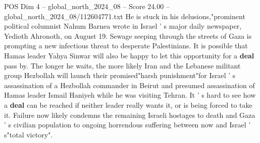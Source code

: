 \begin{textsample}{POS Dim 4 – global\_north\_2024\_08 – Score 24.00 – global\_north\_2024\_08/112604771.txt}
He is stuck in his delusions,"prominent political columnist Nahum Barnea wrote in Israel ' s major daily newspaper, Yedioth Ahronoth, on August 19.
Sewage seeping through the streets of Gaza is prompting a new infectious threat to desperate Palestinians.
It is possible that Hamas leader Yahya Sinwar will also be happy to let this opportunity for a \textbf{deal} pass by.
The longer he waits, the more likely Iran and the Lebanese militant group Hezbollah will launch their promised"harsh punishment"for Israel ' s assassination of a Hezbollah commander in Beirut and presumed assassination of Hamas leader Ismail Haniyeh while he was visiting Tehran.
It ' s hard to see how a \textbf{deal} can be reached if neither leader really wants it, or is being forced to take it.
Failure now likely condemns the remaining Israeli hostages to death and Gaza ' s civilian population to ongoing horrendous suffering between now and Israel ' s"total victory".

\end{textsample}
